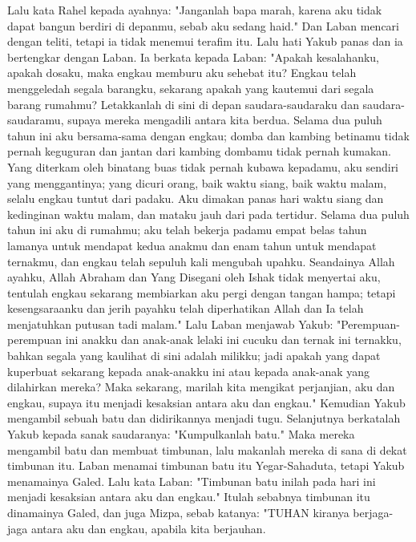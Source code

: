 \begin{biblechapter}
\verse Lalu kata Rahel kepada ayahnya: "Janganlah bapa marah, karena aku tidak dapat bangun berdiri di depanmu, sebab aku sedang haid." Dan Laban mencari dengan teliti, tetapi ia tidak menemui terafim itu.
\verse Lalu hati Yakub panas dan ia bertengkar dengan Laban. Ia berkata kepada Laban: "Apakah kesalahanku, apakah dosaku, maka engkau memburu aku sehebat itu?
\verse Engkau telah menggeledah segala barangku, sekarang apakah yang kautemui dari segala barang rumahmu? Letakkanlah di sini di depan saudara-saudaraku dan saudara-saudaramu, supaya mereka mengadili antara kita berdua.
\verse Selama dua puluh tahun ini aku bersama-sama dengan engkau; domba dan kambing betinamu tidak pernah keguguran dan jantan dari kambing dombamu tidak pernah kumakan.
\verse Yang diterkam oleh binatang buas tidak pernah kubawa kepadamu, aku sendiri yang menggantinya; yang dicuri orang, baik waktu siang, baik waktu malam, selalu engkau tuntut dari padaku.
\verse Aku dimakan panas hari waktu siang dan kedinginan waktu malam, dan mataku jauh dari pada tertidur.
\verse Selama dua puluh tahun ini aku di rumahmu; aku telah bekerja padamu empat belas tahun lamanya untuk mendapat kedua anakmu dan enam tahun untuk mendapat ternakmu, dan engkau telah sepuluh kali mengubah upahku.
\verse Seandainya Allah ayahku, Allah Abraham dan Yang Disegani oleh Ishak tidak menyertai aku, tentulah engkau sekarang membiarkan aku pergi dengan tangan hampa; tetapi kesengsaraanku dan jerih payahku telah diperhatikan Allah dan Ia telah menjatuhkan putusan tadi malam."
 Lalu Laban menjawab Yakub: "Perempuan-perempuan ini anakku dan anak-anak lelaki ini cucuku dan ternak ini ternakku, bahkan segala yang kaulihat di sini adalah milikku; jadi apakah yang dapat kuperbuat sekarang kepada anak-anakku ini atau kepada anak-anak yang dilahirkan mereka?
\verse Maka sekarang, marilah kita mengikat perjanjian, aku dan engkau, supaya itu menjadi kesaksian antara aku dan engkau."
\verse Kemudian Yakub mengambil sebuah batu dan didirikannya menjadi tugu.
\verse Selanjutnya berkatalah Yakub kepada sanak saudaranya: "Kumpulkanlah batu." Maka mereka mengambil batu dan membuat timbunan, lalu makanlah mereka di sana di dekat timbunan itu.
\verse Laban menamai timbunan batu itu Yegar-Sahaduta, tetapi Yakub menamainya Galed.
\verse Lalu kata Laban: "Timbunan batu inilah pada hari ini menjadi kesaksian antara aku dan engkau." Itulah sebabnya timbunan itu dinamainya Galed,
\verse dan juga Mizpa, sebab katanya: "TUHAN kiranya berjaga-jaga antara aku dan engkau, apabila kita berjauhan.

\end{biblechapter}
